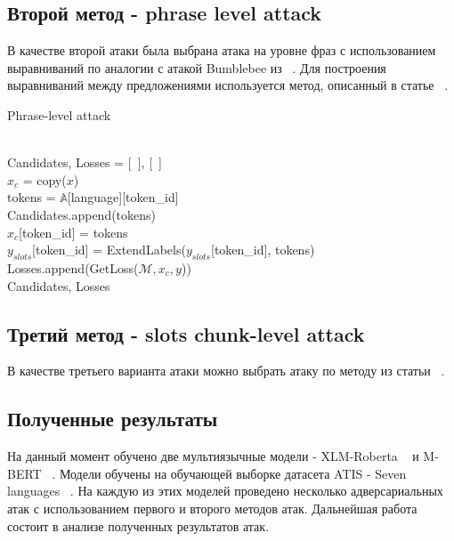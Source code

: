 \newpage

\subsection{Второй метод - phrase level attack}
В качестве второй атаки была выбрана атака на уровне фраз с использованием выравниваний
по аналогии с атакой Bumblebee из ~\cite{Tan2021CodeMixingOS}.
Для построения выравниваний между предложениями используется метод, описанный в статье ~\cite{Dou2021WordAB}.

\begin{algorithm}
    \caption{Phrase-level attack}
    \begin{algorithmic}
            \\
            \ind Candidates, Losses = [~], [~]\\
            \ind$x_c$ = copy($x$)
                \ind{}
                        \\
                        \ind\ind\ind tokens = $\mathbb{A}$[language][token\_id]\\
                        \ind\ind\ind Candidates.append(tokens)\\
                        \ind\ind\ind $x_c$[token\_id] = tokens\\
                        \ind\ind\ind $y_{slots}$[token\_id] = ExtendLabels($y_{slots}$[token\_id], tokens)\\
                        \ind\ind\ind Losses.append(GetLoss($\mathcal{M}, x_c, y$))
                \EndIf
            \EndFor \\
            \Return Candidates, Losses
        \EndFunction
    \end{algorithmic}\label{alg:algorithm2}
\end{algorithm}

\subsection{Третий метод - slots chunk-level attack}
В качестве третьего варианта атаки можно выбрать атаку по методу из статьи ~\cite{Krishnan2021MultilingualCF}.

\subsection{Полученные результаты}
На данный момент обучено две мультиязычные модели - XLM-Roberta ~\cite{Conneau2020UnsupervisedCR} и M-BERT ~\cite{Devlin2019BERTPO}.
Модели обучены на обучающей выборке датасета ATIS - Seven languages ~\cite{Xu2020EndtoEndSA}.
На каждую из этих моделей проведено несколько адверсариальных атак с использованием первого и второго методов атак.
Дальнейшая работа состоит в анализе полученных результатов атак.

